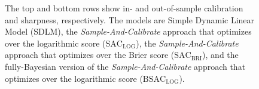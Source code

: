 \documentclass[aoas, preprint]{imsart}
\numberwithin{equation}{section}
\theoremstyle{plain}
\begin{document}
\begin{figure}[h!]
\caption[Optional caption for list of figures]{The top and bottom rows show in- and out-of-sample calibration and sharpness, respectively. The models are Simple Dynamic Linear Model (SDLM), the \textit{Sample-And-Calibrate} approach that optimizes over the logarithmic score ($\text{SAC}_{\text{LOG}}$), the \textit{Sample-And-Calibrate} approach that optimizes over the Brier score ($\text{SAC}_{\text{BRI}}$), and the fully-Bayesian version of the \textit{Sample-And-Calibrate} approach that optimizes over the logarithmic score ($\text{BSAC}_{\text{LOG}}$).
}
\label{Calibration-Out}
\end{figure}
\end{document}
